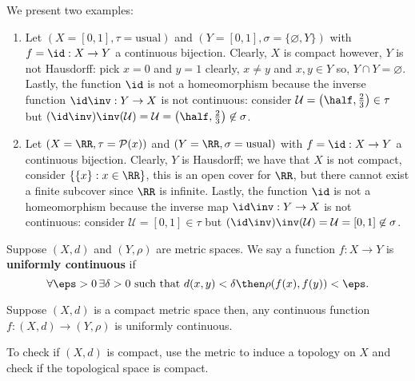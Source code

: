 \documentclass[12pt, a4paper]{article}
\begin{document}
\begin{mdexample}
    We present two examples:
    \begin{enumerate}
        \item Let \((X=[0,1],\tau=\text{usual})\) and \((Y=[0,1],\sigma=\{\varnothing,Y\})\) with \(f=\id :X \to Y\) a continuous bijection. Clearly, \(X\) is compact however, \(Y\) is not Hausdorff: pick \(x =0\) and \(y=1\) clearly, \(x\neq y\) and \(x,y\in Y\) so, \(Y \cap Y=\varnothing\). Lastly, the function \(\id\) is not a homeomorphism because the inverse function \(\id\inv:Y \to X\) is not continuous: consider \(\mathcal{U}=\left( \half,\frac{2}{3} \right) \in \tau\) but \((\id\inv)\inv(\mathcal{U})=\mathcal{U} = \left( \half,\frac{2}{3} \right) \not\in \sigma\).
        \item Let \((X=\RR,\tau=\mathcal{P}(x))\) and \((Y=\RR,\sigma=\text{usual})\) with \(f=\id:X\to Y\) a continuous bijection. Clearly, \(Y\) is Hausdorff; we have that \(X\) is not compact, consider \(\{\{x\} :x \in \RR\}\), this is an open cover for \(\RR\), but there cannot exist a finite subcover since \(\RR\) is infinite. Lastly, the function \(\id\) is not a homeomorphism because the inverse map \(\id\inv:Y \to X\) is not continuous: consider \(\mathcal{U}=[0,1] \in \tau\) but \((\id\inv)\inv(\mathcal{U})=\mathcal{U} =[0,1] \not\in \sigma\).
    \end{enumerate}
\end{mdexample}

\begin{definition}
    Suppose \((X,d)\) and \((Y,\rho)\) are metric spaces. We say a function \(f:X \to Y\) is \textbf{uniformly continuous} if 
    \[\forall \eps>0 \, \exists \delta>0 \text{ such that } d(x,y)<\delta \then \rho(f(x),f(y))<\eps.\]
\end{definition}

\begin{mdthm}
    Suppose \((X,d)\) is a compact metric space then, any continuous function \(f:(X,d) \to (Y,\rho)\) is uniformly continuous.
\end{mdthm}

\begin{mdremark}
    To check if \((X,d)\) is compact, use the metric to induce a topology on \(X\) and check if the topological space is compact.
\end{mdremark}
\end{document}
